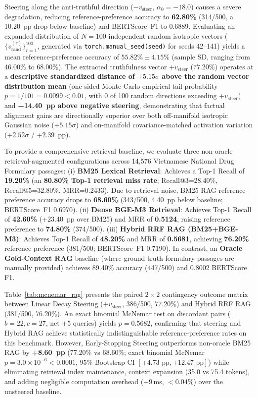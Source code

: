 Steering along the anti-truthful direction ($-v_{\text{steer}}$, $\alpha_0=-18.0$) causes a severe degradation, reducing reference-preference accuracy to \textbf{62.80\%} (314/500, a 10.20~pp drop below baseline) and BERTScore~F1 to 0.6889. Evaluating an expanded distribution of $N=100$ independent random isotropic vectors ($\{v_{\text{rand}}^{(r)}\}_{r=1}^{100}$, generated via \texttt{torch.manual\_seed(seed)} for seeds 42--141) yields a mean reference-preference accuracy of \textbf{$55.82\% \pm 4.15\%$} (sample SD, ranging from 46.00\% to 68.00\%). The extracted truthfulness vector $+v_{\text{steer}}$ (77.20\%) operates at a \textbf{descriptive standardized distance of $+5.15\sigma$ above the random vector distribution mean} (one-sided Monte Carlo empirical tail probability $p=1/101=0.0099 < 0.01$, with 0 of 100 random directions exceeding $+v_{\text{steer}}$) and \textbf{+14.40~pp above negative steering}, demonstrating that factual alignment gains are directionally superior over both off-manifold isotropic Gaussian noise ($+5.15\sigma$) and on-manifold covariance-matched activation variation ($+2.52\sigma$ / +2.39~pp).

To provide a comprehensive retrieval baseline, we evaluate three non-oracle retrieval-augmented configurations across 14,576 Vietnamese National Drug Formulary passages: (i) \textbf{BM25 Lexical Retrieval}: Achieves a Top-1 Recall of \textbf{19.20\%} (an \textbf{80.80\% Top-1 retrieval miss rate}; Recall@3=28.40\%, Recall@5=32.80\%, MRR=0.2433). Due to retrieval noise, BM25 RAG reference-preference accuracy drops to \textbf{68.60\%} (343/500, 4.40~pp below baseline; BERTScore~F1 0.6970). (ii) \textbf{Dense BGE-M3 Retrieval}: Achieves Top-1 Recall of \textbf{42.60\%} (+23.40~pp over BM25) and MRR of \textbf{0.5124}, raising reference preference to \textbf{74.80\%} (374/500). (iii) \textbf{Hybrid RRF RAG (BM25+BGE-M3)}: Achieves Top-1 Recall of \textbf{48.20\%} and MRR of \textbf{0.5681}, achieving \textbf{76.20\%} reference preference (381/500; BERTScore~F1 0.7190). In contrast, an \textbf{Oracle Gold-Context RAG} baseline (where ground-truth formulary passages are manually provided) achieves 89.40\% accuracy (447/500) and 0.8002 BERTScore F1.

Table~\ref{tab:mcnemar_rag} presents the paired $2\times 2$ contingency outcome matrix between Linear Decay Steering ($+v_{\text{steer}}$, 386/500, 77.20\%) and Hybrid RRF RAG (381/500, 76.20\%). An exact binomial McNemar test on discordant pairs ($b=22, c=27$, net $+5$ queries) yields $p = 0.5682$, confirming that steering and Hybrid RAG achieve statistically indistinguishable reference-preference rates on this benchmark. However, Early-Stopping Steering outperforms non-oracle BM25 RAG by \textbf{+8.60~pp} (77.20\% vs 68.60\%; exact binomial McNemar $p = 3.0 \times 10^{-6} < 0.0001$, 95\% Bootstrap CI $[+4.73\text{ pp}, +12.47\text{ pp}]$) while eliminating retrieval index maintenance, context expansion (35.0 vs 75.4 tokens), and adding negligible computation overhead (+9\,ms, $<0.04\%$) over the unsteered baseline.

